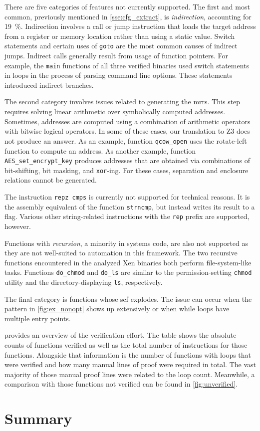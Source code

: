 There are five categories of features not currently supported.
The first and most common, previously mentioned in \cref{sse:cfg_extract},
is \emph{indirection}, accounting for \SI{19}{\percent}.%
Indirection involves a call or jump instruction
that loads the target address from a register or memory location
rather than using a static value.
Switch statements and certain uses of \texttt{goto}
are the most common causes of indirect jumps.
Indirect calls generally result from usage of function pointers.
For example, the \lstinline|main| functions of all three verified binaries
used switch statements in loops in the process of parsing command line options.
These statements introduced indirect branches.

The second category involves issues related to generating the \acp{mrr}.
This step requires solving linear arithmetic over symbolically computed addresses.%
Sometimes, addresses are computed using a combination of arithmetic operators%
with bitwise logical operators.%
In some of these cases, our translation to Z3 does not produce an answer.%
As an example, function \texttt{qcow\_open}
uses the rotate-left function to compute an address.
As another example, function \texttt{AES\_set\_encrypt\_key}
produces addresses that are obtained via combinations of bit-shifting,
bit masking, and \texttt{xor}-ing.
For these cases, separation and enclosure relations cannot be generated.

The instruction \texttt{repz cmps} is currently not supported for technical reasons.
It is the assembly equivalent of the function \texttt{strncmp},
but instead writes its result to a flag.
Various other string-related instructions with the \texttt{rep} prefix are supported,
however.

Functions with \emph{recursion}, a minority in systems code, are also not supported
as they are not well-suited to automation in this framework.
The two recursive functions encountered in the analyzed Xen binaries
both perform file-system-like tasks.
Functions \lstinline|do_chmod| and \lstinline|do_ls|
are similar to the permission-setting \lstinline|chmod| utility
and the directory-displaying \lstinline|ls|, respectively.

The final category is functions whose \ac{scf} explodes.
The issue can occur when the pattern in \cref{fig:ex_nonopt} shows up extensively
or when while loops have multiple entry points.

 provides an overview of the verification effort.
The table shows the absolute counts of functions verified
as well as the total number of instructions for those functions.
Alongside that information is the number of functions with loops
that were verified and how many manual lines of proof were required in total.
The vast majority of those manual proof lines were related to the loop count.
Meanwhile, a comparison with those functions not verified
can be found in \cref{fig:unverified}.

\section{Summary}
